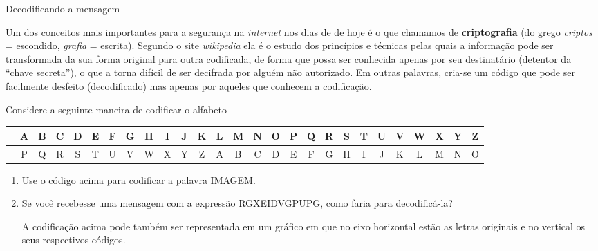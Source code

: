 \begin{task}{ Decodificando a mensagem}
\label{\detokenize{AF106-A:atividade-decodificando-a-mensagem}}\label{\detokenize{AF106-A:ativ-decodificando}}

Um dos conceitos mais importantes para a segurança na \emph{internet} nos dias de de hoje é o que chamamos de \textbf{criptografia} (do grego \emph{criptos} = escondido, \emph{grafia} = escrita). Segundo o site \emph{wikipedia} ela é o estudo dos princípios e técnicas pelas quais a informação pode ser transformada da sua forma original para outra codificada, de forma que possa ser conhecida apenas por seu destinatário (detentor da “chave secreta”), o que a torna difícil de ser decifrada por alguém não autorizado. Em outras palavras, cria-se um código que pode ser facilmente desfeito (decodificado) mas apenas por aqueles que conhecem a codificação.

Considere a seguinte maneira de codificar o alfabeto

\begin{table}[H]
\centering
\setlength\tabcolsep{3pt}
\begin{tabular}{|c|c|c|c|c|c|c|c|c|c|c|c|c|c|c|c|c|c|c|c|c|c|c|c|c|c|c|}
\hline
\cellcolor{\currentcolor!80}{\textcolor{white}{\textbf{Original}}} & A & B & C & D & E & F & G & H & I & J & K & L & M & N & O & P & Q & R & S & T & U & V & W & X & Y & Z \\
\hline
\cellcolor{\currentcolor!80}{\textcolor{white}{\textbf{Código}}} & P & Q & R & S & T & U & V & W & X & Y & Z & A & B & C & D & E & F & G & H & I & J & K & L & M & N & O \\
\hline
\end{tabular}
\end{table}

\begin{enumerate}
\item {} 
Use o código acima para codificar a palavra IMAGEM.

\item {} 
Se você recebesse uma mensagem com a expressão RGXEIDVGPUPG, como faria para decodificá-la?

A codificação acima pode também ser representada em um gráfico em que no eixo horizontal estão as letras originais e no vertical os seus respectivos códigos.

\begin{figure}[H]
\centering


\end{figure}
\end{enumerate}
\end{task}
